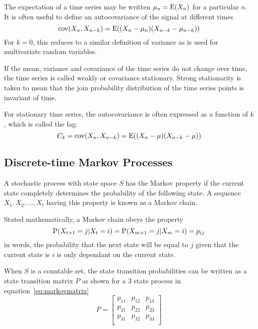The expectation of a time series may be written $\mu_n = \mathrm{E}(X_n)$ for a particular $n$.
It is often useful to define an autocovariance of the signal at different times \citep[21]{kitagawa2009introduction}
\begin{equation}
  \label{eq:autocovariance}
  \textrm{cov}(X_n,X_{n-k}) = \mathrm{E}((X_n-\mu_n)(X_{n-k} - \mu_{n-k}))
\end{equation}
For $k=0$, this reduces to a similar definition of variance as is used for multivariate random variables.

If the mean, variance and covariance of the time series do not change over time, the time series is called weakly or covariance stationary.
Strong stationarity is taken to mean that the join probability distribution of the time series points is invariant of time.~\citep[20]{kitagawa2009introduction}

For stationary time series, the autocovariance is often expressed as a function of $k$, which is called the lag:
\begin{equation}
  \label{eq:autocovariance}
  C_k = \textrm{cov}(X_n, X_{n-k}) = \mathrm{E}((X_n-\mu)(X_{n-k}-\mu))
\end{equation}

\subsection{Discrete-time Markov Processes}
A stochastic process with state space $S$ has the Markov property if the current state completely determines the probability of the following state.
A sequence $X_1,X_2, \dots ,X_t$ having this property is known as a Markov chain.

Stated mathematically, a Markov chain obeys the property
\begin{equation}
  \label{eq:markovproperty}
  \mathrm{P}(X_{t+1} = j|X_{t}=i) = \mathrm{P}(X_{m+1}=j|X_{m}=i)=p_{ij}
\end{equation}
in words, the probability that the next state will be equal to $j$ given that the current state is $i$ is only dependant on the current state.

When $S$ is a countable set, the state transition probabilities can be written  as a state transition matrix $P$ as shown for a 3 state process in equation~\ref{eq:markovmatrix}
\begin{equation}
\label{eq:markovmatrix}
P = \left[ 
  \begin{array}{cccc}
    p_{11} & p_{12} & p_{13}\\
    p_{21} & p_{22} & p_{23}\\
    p_{31} & p_{32} & p_{33}\\
  \end{array} \right ]
\end{equation}

